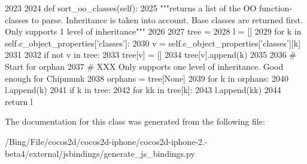 \begin{DoxyCode}
2023 
2024     def sort_oo_classes(self):
2025         """returns a list of the OO function-classes to parse. Inheritance is
       taken into account. Base classes are returned first. Only supports 1 level of
       inheritance"""
2026 
2027         tree = {}
2028         l = []
2029         for k in self.c_object_properties['classes']:
2030             v = self.c_object_properties['classes'][k]
2031 
2032             if not v in tree:
2033                 tree[v] = []
2034             tree[v].append(k)
2035 
2036         # Start for orphan
2037         # XXX Only supports one level of inheritance. Good enough for Chipmunk
2038         orphans = tree[None]
2039         for k in orphans:
2040             l.append(k)
2041             if k in tree:
2042                 for kk in tree[k]:
2043                     l.append(kk)
2044         return l

\end{DoxyCode}


The documentation for this class was generated from the following file\-:\begin{DoxyCompactItemize}
\item 
/\-Bing/\-File/cocos2d/cocos2d-\/iphone/cocos2d-\/iphone-\/2.-\/beta4/external/jsbindings/generate\-\_\-js\-\_\-bindings.\-py\end{DoxyCompactItemize}

